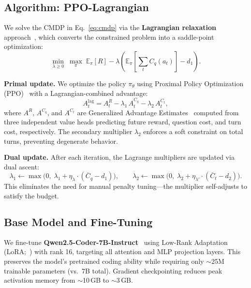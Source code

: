 \documentclass[11pt]{article}
\begin{document}
\subsection{Algorithm: PPO-Lagrangian}

We solve the CMDP in Eq.~\eqref{eq:cmdp} via the \textbf{Lagrangian relaxation} approach~\citep{tessler2018reward, stooke2020responsive}, which converts the constrained problem into a saddle-point optimization:
\begin{equation}
  \min_{\lambda \geq 0} \; \max_\pi \; \mathbb{E}_\pi[R] - \lambda \!\left(\mathbb{E}_\pi\!\left[\textstyle\sum_t C_q(a_t)\right] - d_1\right).
\end{equation}

\textbf{Primal update.} We optimize the policy $\pi_\theta$ using Proximal Policy Optimization (PPO)~\citep{schulman2017ppo} with a Lagrangian-combined advantage:
\begin{equation}
  A^{\text{lag}}_t = A^R_t - \lambda_1 \, A^{C_q}_t - \lambda_2 \, A^{C_t}_t,
\end{equation}
where $A^R$, $A^{C_q}$, and $A^{C_t}$ are Generalized Advantage Estimates~\citep{schulman2015gae} computed from three independent value heads predicting future reward, question cost, and turn cost, respectively. The secondary multiplier $\lambda_2$ enforces a soft constraint on total turns, preventing degenerate behavior.

\textbf{Dual update.} After each iteration, the Lagrange multipliers are updated via dual ascent:
\begin{equation}
  \lambda_1 \leftarrow \max\!\big(0,\; \lambda_1 + \eta_\lambda \cdot (\overline{C}_q - d_1)\big), \qquad
  \lambda_2 \leftarrow \max\!\big(0,\; \lambda_2 + \eta_{\lambda'} \cdot (\overline{C}_t - d_2)\big).
\end{equation}
This eliminates the need for manual penalty tuning---the multiplier self-adjusts to satisfy the budget.

\subsection{Base Model and Fine-Tuning}

We fine-tune \textbf{Qwen2.5-Coder-7B-Instruct}~\citep{qwen2.5coder} using Low-Rank Adaptation (LoRA;~\citealt{hu2022lora}) with rank 16, targeting all attention and MLP projection layers. This preserves the model's pretrained coding ability while requiring only $\sim$25M trainable parameters (vs.\ 7B total). Gradient checkpointing reduces peak activation memory from $\sim$10\,GB to $\sim$3\,GB.
\end{document}
